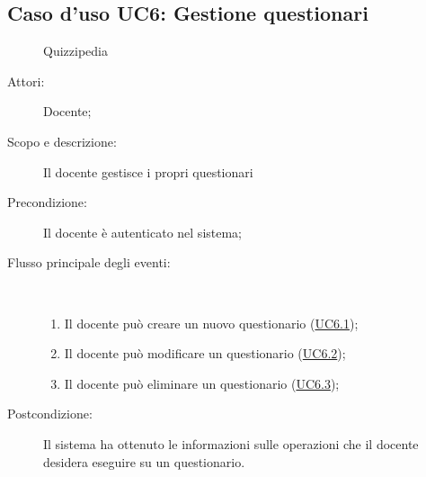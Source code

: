 \subsection{Caso d'uso UC6: Gestione questionari}
	\begin{figure}[H]
		\centering
		\begin{resizedtikzpicture}{\textwidth}
		\begin{umlsystem}[x=0, fill=lightgray!20]{Quizzipedia}
		\end{umlsystem}
		\end{resizedtikzpicture}
		\caption{}
	\end{figure}
\begin{description}
\item[Attori:] Docente;
\item[Scopo e descrizione:] Il docente gestisce i propri questionari
      \item[Precondizione:] Il docente è autenticato nel sistema;

        \item[Flusso principale degli eventi:] \ 
 \begin{enumerate}
          \item Il docente può creare un nuovo questionario (\hyperlink{UC6.1}{UC6.1});
          \item Il docente può modificare un questionario (\hyperlink{UC6.2}{UC6.2});
          \item Il docente può eliminare un questionario (\hyperlink{UC6.3}{UC6.3});

      \end{enumerate}
    \item[Postcondizione:] Il sistema ha ottenuto le informazioni sulle operazioni che il docente desidera eseguire su un questionario.
  \end{description}
\hypertarget{UC6.1}{}

